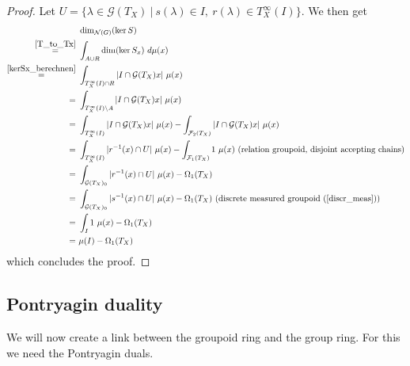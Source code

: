 \documentclass[12pt,a4paper]{scrartcl}
\theoremstyle{plain}
\theoremstyle{definition}
\newcommand{\2}{\mathbb{Z} / 2 \mathbb{Z}}
\newcommand{\G}{\mathcal{G}}
\newcommand{\1}{\bar{1}}
\newcommand{\0}{\bar{0}}
\begin{document}
\begin{proof}
	Let $U = \{\lambda \in \G (T_X)~|~ s(\lambda) \in I,~ r(\lambda) \in T_X^\infty(I)\}$. We then get
	\begin{align*}
		 &~ \dim_{\mathcal{N}(G)}(\ker S) \\
		\overset{\ref{T_to_Tx}}{=}&~ \int_{A \cup R} \dim (\ker S_x) \ d \mu (x) \\
		\overset{\ref{kerSx_berechnen}}{=}&~ \int_{T_X^\infty(I) \cap R} |I \cap \G (T_X)x| \ \mu (x) \\
		=&~ \int_{T_X^\infty(I) \setminus A} |I \cap \G (T_X)x| \ \mu (x) \\
		=&~ \int_{T_X^\infty(I)} |I \cap \G (T_X)x| \ \mu (x) - \int_{\mathcal{F}_2(T_X)} |I \cap \G (T_X)x| \ \mu (x) \\
		=&~ \int_{T_X^\infty(I)} |r^{-1}(x) \cap U| \ \mu (x)  - \int_{\mathcal{F}_1(T_X)} 1 \ \mu (x) ~ \text{(relation groupoid, disjoint accepting chains)}\\
		=&~ \int_{\G (T_X)_0} |r^{-1}(x) \cap U| \ \mu (x) - \Omega_1(T_X) \\
		=&~ \int_{\G (T_X)_0} |s^{-1}(x) \cap U| \ \mu (x) - \Omega_1(T_X) ~ \text{(discrete measured groupoid (\ref{discr_meas}))} \\
		=&~ \int_{I} 1 \ \mu (x) - \Omega_1(T_X) \\
		=&~ \mu(I) - \Omega_1(T_X)
	\end{align*}
	which concludes the proof.
\end{proof}
\subsection{Pontryagin duality}
We will now create a link between the groupoid ring and the group ring. For this we need the Pontryagin duals.
\end{document}
